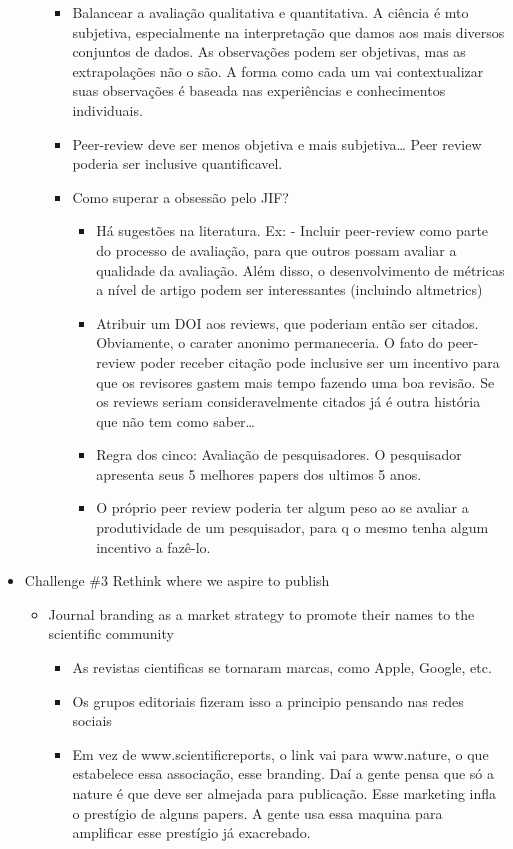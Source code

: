 \documentclass[11pt]{article}
\begin{document}
\begin{itemize}
\begin{itemize}
\begin{itemize}
\item Balancear a avaliação qualitativa e quantitativa. A ciência é mto subjetiva, especialmente na interpretação que damos aos mais diversos conjuntos de dados. As observações podem ser objetivas, mas as extrapolações não o são. A forma como cada um vai contextualizar suas observações é baseada nas experiências e conhecimentos individuais.
\item Peer-review deve ser menos objetiva e mais subjetiva\ldots{} Peer review poderia ser inclusive quantificavel.
\item Como superar a obsessão pelo JIF?
\begin{itemize}
\item Há sugestões na literatura. Ex: \cite{stern2019} - Incluir peer-review como parte do processo de avaliação, para que outros possam avaliar a qualidade da avaliação. Além disso, o desenvolvimento de métricas a nível de artigo podem ser interessantes (incluindo altmetrics)
\item Atribuir um DOI aos reviews, que poderiam então ser citados. Obviamente, o  carater anonimo permaneceria. O fato do peer-review poder receber citação pode inclusive ser um incentivo para que os revisores gastem mais tempo fazendo uma boa revisão. Se os reviews seriam consideravelmente citados já é outra história que não tem como saber\ldots{}
\item Regra dos cinco: Avaliação de pesquisadores. O pesquisador apresenta seus 5 melhores papers dos ultimos 5 anos.
\item O próprio peer review poderia ter algum peso ao se avaliar a produtividade de um pesquisador, para q o mesmo tenha algum incentivo a fazê-lo.
\end{itemize}
\end{itemize}
\end{itemize}
\item Challenge \#3 Rethink where we aspire to publish
\begin{itemize}
\item Journal branding as a market strategy to promote their names to the scientific community
\begin{itemize}
\item As revistas cientificas se tornaram marcas, como Apple, Google, etc.
\item Os grupos editoriais fizeram isso a principio pensando nas redes sociais
\item Em vez de www.scientificreports, o link vai para www.nature, o que estabelece essa associação, esse branding. Daí a gente pensa que só a nature é que deve ser almejada para publicação. Esse marketing infla o prestígio de alguns papers. A gente usa essa maquina para amplificar esse prestígio já exacrebado.

\end{itemize}
\end{itemize}
\end{itemize}
\end{document}
